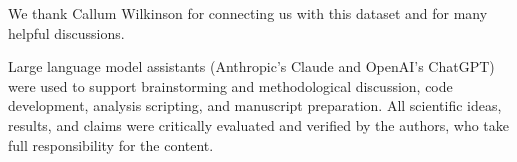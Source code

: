\documentclass[11pt]{article}
\begin{document}
We thank Callum Wilkinson for connecting us with this dataset and for many helpful discussions.

Large language model assistants (Anthropic's Claude and OpenAI's ChatGPT) were used to support brainstorming and methodological discussion, code development, analysis scripting, and manuscript preparation. All scientific ideas, results, and claims were critically evaluated and verified by the authors, who take full responsibility for the content.

\appendix





\printbibliography
\end{document}

